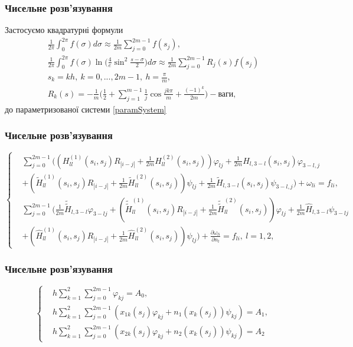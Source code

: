 \documentclass[10pt]{beamer}
\begin{document}
 \begin{frame}
\frametitle{Чисельне розв'язування}
Застосуємо квадратурні формули 
 \begin{gather}
 	\frac{1}{2\pi}\int_{0}^{2\pi}f(\sigma)d\sigma\approx\frac{1}{2m}\sum_{j=0}^{2m-1}f(s_j), \\
	\frac{1}{2\pi}\int_{0}^{2\pi}f(\sigma)\ln\bigg(\frac{4}{e}\sin^2\frac{s-\sigma}{2}\bigg)d\sigma\approx\frac{1}{2m}\sum_{j=0}^{2m-1}R_j(s)f(s_j) \\
	s_k=kh, \ k=0,...,2m-1, \ h=\frac{\pi}{m}, \nonumber \\
	R_k(s)=-\frac{1}{m}\bigg(\frac{1}{2}+\sum_{j=1}^{m-1}\frac{1}{j}\cos \frac{jk\pi}{m}+ \frac{(-1)^k}{2m}\bigg) - \textrm{ваги} \nonumber ,
 \end{gather}
  до параметризованої системи \eqref{paramSystem}
\end{frame}

\begin{frame}
\frametitle{Чисельне розв'язування}
\begin{equation} \label{lastSys}
  \left\{
  \begin{split}
  	&\sum_{j=0}^{2m-1}\bigg((H^{(1)}_{ll}(s_i, s_j)R_{|i-j|}+\frac{1}{2m}H^{(2)}_{ll}(s_i, s_j))\varphi_{lj}+\frac{1}{2m}H_{l,3-l}(s_i, s_j)\varphi_{3-l,j} \\ 
	&+(\tilde{H}^{(1)}_{ll}(s_i, s_j)R_{|i-j|} +\frac{1}{2m}\tilde{H}^{(2)}_{ll}(s_i, s_j))\psi_{lj}+\frac{1}{2m}\tilde{H}_{l,3-l}(s_i, s_j)\psi_{3-l,j}\bigg) + \omega_{li}=f_{li},\\
	 &\sum_{j=0}^{2m-1}\bigg(\frac{1}{2m}\tilde{\tilde{H}}_{l,3-l}\varphi_{3-lj}+(\tilde{\tilde{H}}^{(1)}_{ll}(s_i, s_j)R_{|i-j|}+\frac{1}{2m}\tilde{\tilde{H}}^{(2)}_{ll}(s_i, s_j))\varphi_{lj} + \frac{1}{2m}\hat{H}_{l,3-l}\psi_{3-lj}\\
	 &+(\hat{H}^{(1)}_{ll}(s_i, s_j)R_{|i-j|}+\frac{1}{2m}\hat{H}^{(2)}_{ll}(s_i, s_j))\psi_{lj}\bigg) +\frac{\partial\omega_{li}}{\partial n_l}=f_{li},\ l=1,2,
\end{split}
\right.
\end{equation}
\end{frame}

\begin{frame}
\frametitle{Чисельне розв'язування}
\begin{equation} \label{lastSys}
  \left\{
  \begin{split}
	 &h\sum_{k=1}^{2}\sum_{j=0}^{2m-1}\varphi_{kj}=A_0, \\
	 &h\sum_{k=1}^{2}\sum_{j=0}^{2m-1}(x_{1k}(s_j)\varphi_{kj}+n_1(x_k(s_j))\psi_{kj})=A_1, \\
	 &h\sum_{k=1}^{2}\sum_{j=0}^{2m-1}(x_{2k}(s_j)\varphi_{kj}+n_2(x_k(s_j))\psi_{kj})=A_2
\end{split}
\right.
\end{equation}
\end{frame}
\end{document}

